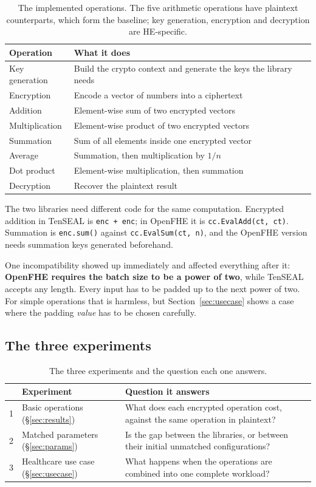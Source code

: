 \documentclass[11pt,a4paper]{article}
\begin{document}
\begin{table}[H]\centering\small
\begin{tabular}{@{}ll@{}}
\toprule
\textbf{Operation} & \textbf{What it does} \\
\midrule
Key generation & Build the crypto context and generate the keys the library needs \\
Encryption & Encode a vector of numbers into a ciphertext \\
Addition & Element-wise sum of two encrypted vectors \\
Multiplication & Element-wise product of two encrypted vectors \\
Summation & Sum of all elements inside one encrypted vector \\
Average & Summation, then multiplication by $1/n$ \\
Dot product & Element-wise multiplication, then summation \\
Decryption & Recover the plaintext result \\
\bottomrule
\end{tabular}
\caption{The implemented operations. The five arithmetic operations have plaintext
counterparts, which form the baseline; key generation, encryption and decryption are
HE-specific.}
\end{table}

The two libraries need different code for the same computation. Encrypted addition
in TenSEAL is \texttt{enc + enc}; in OpenFHE it is \texttt{cc.EvalAdd(ct, ct)}.
Summation is \texttt{enc.sum()} against \texttt{cc.EvalSum(ct, n)}, and the OpenFHE
version needs summation keys generated beforehand.

One incompatibility showed up immediately and affected everything after it:
\textbf{OpenFHE requires the batch size to be a power of two}, while TenSEAL accepts
any length. Every input has to be padded up to the next power of two. For simple
operations that is harmless, but Section~\ref{sec:usecase} shows a case where the
padding \emph{value} has to be chosen carefully.

\subsection{The three experiments}

\begin{table}[H]\centering\small
\begin{tabular}{@{}llp{7.6cm}@{}}
\toprule
& \textbf{Experiment} & \textbf{Question it answers} \\
\midrule
1 & Basic operations (\S\ref{sec:results})    & What does each encrypted operation cost, against the same operation in plaintext? \\
2 & Matched parameters (\S\ref{sec:params})   & Is the gap between the libraries, or between their initial unmatched configurations? \\
3 & Healthcare use case (\S\ref{sec:usecase}) & What happens when the operations are combined into one complete workload? \\
\bottomrule
\end{tabular}
\caption{The three experiments and the question each one answers.}
\end{table}
\end{document}
